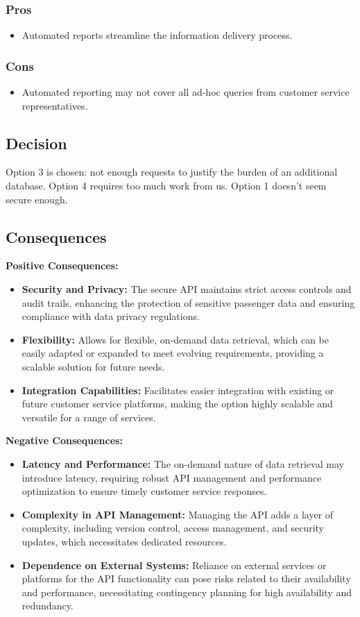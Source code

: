 \subsubsection*{Pros}
\begin{itemize}
    \item Automated reports streamline the information delivery process.
\end{itemize}
\subsubsection*{Cons}
\begin{itemize}
    \item Automated reporting may not cover all ad-hoc queries from customer service representatives.
\end{itemize}

\subsection*{Decision}
Option 3 is chosen: not enough requests to justify the burden of an additional database. Option 4 requires too much work from us. Option 1 doesn't seem secure enough.

\subsection*{Consequences}
\textbf{Positive Consequences:}
\begin{itemize}[noitemsep]
    \item \textbf{Security and Privacy:} The secure API maintains strict access controls and audit trails, enhancing the protection of sensitive passenger data and ensuring compliance with data privacy regulations.
    \item \textbf{Flexibility:} Allows for flexible, on-demand data retrieval, which can be easily adapted or expanded to meet evolving requirements, providing a scalable solution for future needs.
    \item \textbf{Integration Capabilities:} Facilitates easier integration with existing or future customer service platforms, making the option highly scalable and versatile for a range of services.
\end{itemize}

\textbf{Negative Consequences:}
\begin{itemize}[noitemsep]
    \item \textbf{Latency and Performance:} The on-demand nature of data retrieval may introduce latency, requiring robust API management and performance optimization to ensure timely customer service responses.
    \item \textbf{Complexity in API Management:} Managing the API adds a layer of complexity, including version control, access management, and security updates, which necessitates dedicated resources.
    \item \textbf{Dependence on External Systems:} Reliance on external services or platforms for the API functionality can pose risks related to their availability and performance, necessitating contingency planning for high availability and redundancy.
\end{itemize}